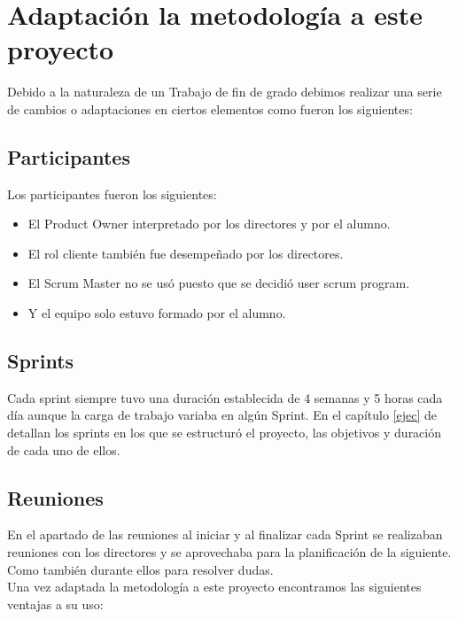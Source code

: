 \section{Adaptación la metodología a este proyecto }
 Debido a la naturaleza de un Trabajo de fin de grado  debimos realizar una serie de cambios o adaptaciones en ciertos elementos como fueron los siguientes:
\subsection{Participantes}
Los participantes fueron los siguientes:
\begin{itemize}
\item El Product Owner interpretado por los  directores y por el alumno.
\item El rol  cliente también fue desempeñado por los directores.
\item El Scrum Master no se usó puesto que se decidió 
 user scrum program.
\item  Y el equipo solo estuvo formado por el alumno.

\end{itemize}

\subsection{Sprints}
Cada sprint siempre tuvo una duración establecida de 4 semanas y 5 horas cada día aunque la carga de trabajo variaba en algún Sprint.
En el capítulo \ref{ejec} de detallan los sprints en los que se estructuró el proyecto, las objetivos y duración de cada uno de ellos.

\subsection{Reuniones}

En el apartado de las reuniones al iniciar y al finalizar cada Sprint se realizaban reuniones con los directores y se aprovechaba para la planificación de la siguiente. Como también durante ellos para resolver dudas.\\

Una vez adaptada la metodología a este proyecto encontramos las siguientes ventajas a su uso:

